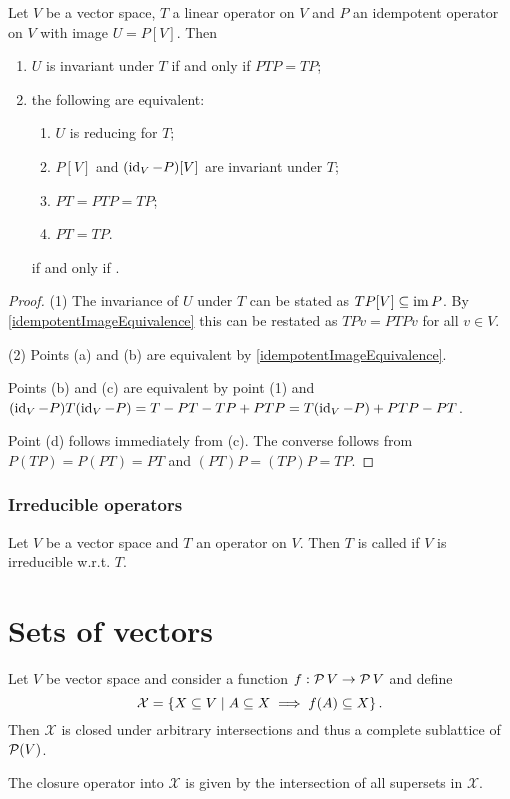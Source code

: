 \begin{lemma}
Let $V$ be a vector space, $T$ a linear operator on $V$ and $P$ an idempotent operator on $V$ with image $U = P[V]$. Then 
\begin{enumerate}
\item $U$ is invariant under $T$ \textup{if and only if} $PTP = TP$;
\item the following are equivalent:
\begin{enumerate}
\item $U$ is reducing for $T$;
\item $P[V]$ and $(\operatorname{id}_V - P)[V]$ are invariant under $T$;
\item $PT = PTP = TP$;
\item $PT = TP$.
\end{enumerate} \textup{if and only if} .
\end{enumerate}
\end{lemma}
\begin{proof}
(1) The invariance of $U$ under $T$ can be stated as $TP[V] \subseteq \operatorname{im} P$. By \ref{idempotentImageEquivalence} this can be restated as $TPv = PTPv$ for all $v\in V$.

(2) Points (a) and (b) are equivalent by \ref{idempotentImageEquivalence}.

Points (b) and (c) are equivalent by point (1) and $(\operatorname{id}_V - P)T(\operatorname{id}_V - P) = T - PT - TP + PTP = T(\operatorname{id}_V - P) + PTP - PT$.

Point (d) follows immediately from (c). The converse follows from $P(TP) = P(PT) = PT$ and $(PT)P = (TP)P = TP$.
\end{proof}

\subsubsection{Irreducible operators}
\begin{definition}
Let $V$ be a vector space and $T$ an operator on $V$. Then $T$ is called  if $V$ is irreducible w.r.t. $T$.
\end{definition}

\section{Sets of vectors}
\begin{proposition} \label{latticesOfVectorSubsets}
Let $V$ be vector space and consider a function $f: \operatorname{\mathcal{P}}{V} \to \operatorname{\mathcal{P}}{V}$ and define
\[ \mathcal{X} = \left\{ X\subseteq V \;\middle|\; A \subseteq X \implies f(A)\subseteq X \right\}. \]
Then $\mathcal{X}$ is closed under arbitrary intersections and thus a complete sublattice of $\operatorname{\mathcal{P}}(V)$.

The closure operator into $\mathcal{X}$ is given by the intersection of all supersets in $\mathcal{X}$.
\end{proposition}

